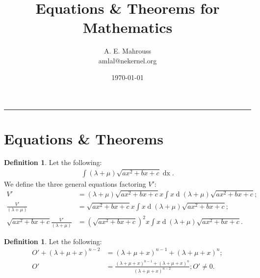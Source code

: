 \documentclass[10pt]{article}
\title{Equations \& Theorems for Mathematics}
\author{A. E. Mahrouss\\amlal@nekernel.org}
\date{\today}
\theoremstyle{plain}
\theoremstyle{definition}
\newtheorem{definition}[theorem]{Definition}
\theoremstyle{remark}
\begin{document}
\maketitle
\vspace{-0.5em}
\vspace{0.8em}
\rule{\linewidth}{0.4pt}
\vspace{1em}

\section{Equations \& Theorems}

\begin{definition}
	Let the following:
	\begin{align*}
		\int (\lambda + \mu)\sqrt{ax^2 + bx  +c} \operatorname{dx}.
	\end{align*}
	We define the three general equations factoring $V'$:
	\begin{align*}
		V' &= (\lambda + \mu)\sqrt{ax^2 + bx  +c}x \int x \operatorname{d}(\lambda + \mu)\sqrt{ax^2 + bx  +c};\\
		\frac{V'}{(\lambda + \mu)} &= \sqrt{ax^2 + bx  +c}x \int x \operatorname{d}(\lambda + \mu)\sqrt{ax^2 + bx  +c};\\
		\sqrt{ax^2 + bx  +c}\frac{V'}{(\lambda + \mu)} &= (\sqrt{ax^2 + bx  +c})^{2}x \int x \operatorname{d}(\lambda + \mu)\sqrt{ax^2 + bx  +c}.
	\end{align*}
\end{definition}
\begin{definition}
	Let the following:
	\begin{align*}
		O' + (\lambda + \mu + x)^{n-2} &= (\lambda + \mu + x)^{n-1} + (\lambda + \mu + x)^{n};\\
		O' &= \frac{(\lambda + \mu + x)^{n-1} + (\lambda + \mu + x)^{n}}{(\lambda + \mu + x)^{n-2}}; O' \neq 0.
	\end{align*}
\end{definition}

\nocite{*}



\end{document}

